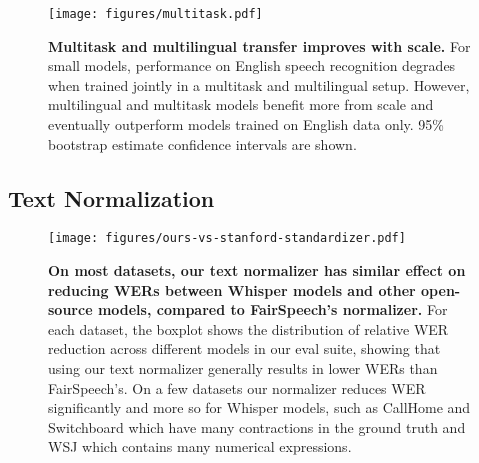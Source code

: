 \begin{figure}[t]
\begin{center}
\centerline{\texttt{[image: figures/multitask.pdf]}}
\caption{\textbf{Multitask and multilingual transfer improves with scale.} For small models, performance on English speech recognition degrades when trained jointly in a multitask and multilingual setup. However, multilingual and multitask models benefit more from scale and eventually outperform models trained on English data only. 95\% bootstrap estimate confidence intervals are shown.}
\label{multilingual_multitask_transfer}
\end{center}
\vspace{-1em}
\end{figure}

\subsection{Text Normalization}\label{subsec:text-normalization-analysis}

\begin{figure}[t]
\begin{center}
\centerline{\texttt{[image: figures/ours-vs-stanford-standardizer.pdf]}}
\caption{\textbf{On most datasets, our text normalizer has similar effect on reducing WERs between Whisper models and other open-source models, compared to FairSpeech's normalizer.} For each dataset, the boxplot shows the distribution of relative WER reduction across different models in our eval suite, showing that using our text normalizer generally results in lower WERs than FairSpeech's. On a few datasets our normalizer reduces WER significantly and more so for Whisper models, such as CallHome and Switchboard which have many contractions in the ground truth and WSJ which contains many numerical expressions.}
\label{fig:text_normalizer}
\end{center}
\vspace{-2em}
\end{figure}

